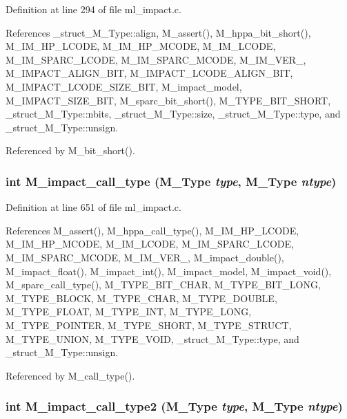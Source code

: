 Definition at line 294 of file ml\_\-impact.c.

References \_\-struct\_\-M\_\-Type::align, M\_\-assert(), M\_\-hppa\_\-bit\_\-short(), M\_\-IM\_\-HP\_\-LCODE, M\_\-IM\_\-HP\_\-MCODE, M\_\-IM\_\-LCODE, M\_\-IM\_\-SPARC\_\-LCODE, M\_\-IM\_\-SPARC\_\-MCODE, M\_\-IM\_\-VER\_, M\_\-IMPACT\_\-ALIGN\_\-BIT, M\_\-IMPACT\_\-LCODE\_\-ALIGN\_\-BIT, M\_\-IMPACT\_\-LCODE\_\-SIZE\_\-BIT, M\_\-impact\_\-model, M\_\-IMPACT\_\-SIZE\_\-BIT, M\_\-sparc\_\-bit\_\-short(), M\_\-TYPE\_\-BIT\_\-SHORT, \_\-struct\_\-M\_\-Type::nbits, \_\-struct\_\-M\_\-Type::size, \_\-struct\_\-M\_\-Type::type, and \_\-struct\_\-M\_\-Type::unsign.

Referenced by M\_\-bit\_\-short().
\subsubsection{\setlength{\rightskip}{0pt plus 5cm}int M\_\-impact\_\-call\_\-type (\bf{M\_\-Type} {\em type}, \bf{M\_\-Type} {\em ntype})}\label{m__impact_8h_3a7eece9501df8e160fe2c727acb66c4}




Definition at line 651 of file ml\_\-impact.c.

References M\_\-assert(), M\_\-hppa\_\-call\_\-type(), M\_\-IM\_\-HP\_\-LCODE, M\_\-IM\_\-HP\_\-MCODE, M\_\-IM\_\-LCODE, M\_\-IM\_\-SPARC\_\-LCODE, M\_\-IM\_\-SPARC\_\-MCODE, M\_\-IM\_\-VER\_, M\_\-impact\_\-double(), M\_\-impact\_\-float(), M\_\-impact\_\-int(), M\_\-impact\_\-model, M\_\-impact\_\-void(), M\_\-sparc\_\-call\_\-type(), M\_\-TYPE\_\-BIT\_\-CHAR, M\_\-TYPE\_\-BIT\_\-LONG, M\_\-TYPE\_\-BLOCK, M\_\-TYPE\_\-CHAR, M\_\-TYPE\_\-DOUBLE, M\_\-TYPE\_\-FLOAT, M\_\-TYPE\_\-INT, M\_\-TYPE\_\-LONG, M\_\-TYPE\_\-POINTER, M\_\-TYPE\_\-SHORT, M\_\-TYPE\_\-STRUCT, M\_\-TYPE\_\-UNION, M\_\-TYPE\_\-VOID, \_\-struct\_\-M\_\-Type::type, and \_\-struct\_\-M\_\-Type::unsign.

Referenced by M\_\-call\_\-type().
\subsubsection{\setlength{\rightskip}{0pt plus 5cm}int M\_\-impact\_\-call\_\-type2 (\bf{M\_\-Type} {\em type}, \bf{M\_\-Type} {\em ntype})}\label{m__impact_8h_50f1220ba58ed00fae9a86a14f7a71dc}




